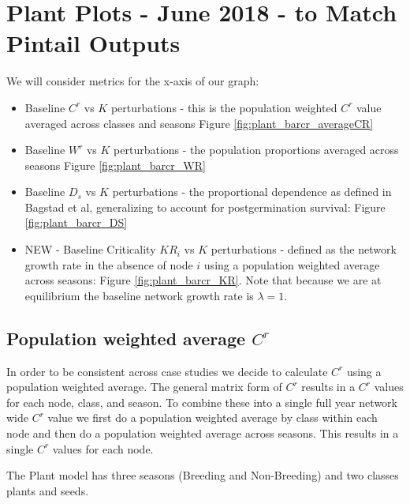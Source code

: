 \documentclass[10pt]{article}
\begin{document}
\section{Plant Plots - June 2018 - to Match Pintail Outputs}

We will consider metrics for the x-axis of our graph:
\begin{itemize}
\item Baseline $C^r$ vs $K$ perturbations - this is the population weighted $C^r$ value averaged across classes and seasons Figure \ref{fig:plant_barcr_averageCR}
\item Baseline $W^r$ vs $K$ perturbations - the population proportions averaged across seasons Figure \ref{fig:plant_barcr_WR}
\item Baseline $D_s$ vs $K$ perturbations - the proportional dependence as defined in Bagstad et al, generalizing to account for postgermination survival: Figure \ref{fig:plant_barcr_DS}
\item NEW - Baseline Criticality $KR_i$ vs $K$ perturbations - defined as the network growth rate in the absence of node $i$ using a population weighted average across seasons: Figure \ref{fig:plant_barcr_KR}. Note that because we are at equilibrium the baseline network growth rate is $\lambda = 1$.
\end{itemize}

\newpage
\subsection{Population weighted average \texorpdfstring{$C^r$}{CR}}

In order to be consistent across case studies we decide to calculate $C^r$ using a population weighted average. The general matrix form of $C^r$ results in a $C^r$ values for each node, class, and season. To combine these into a single full year network wide $C^r$ value we first do a population weighted average by class within each node and then do a population weighted average across seasons. This results in a single $C^r$ values for each node.

The Plant model has three seasons (Breeding and Non-Breeding) and two classes plants and seeds.
\end{document}
